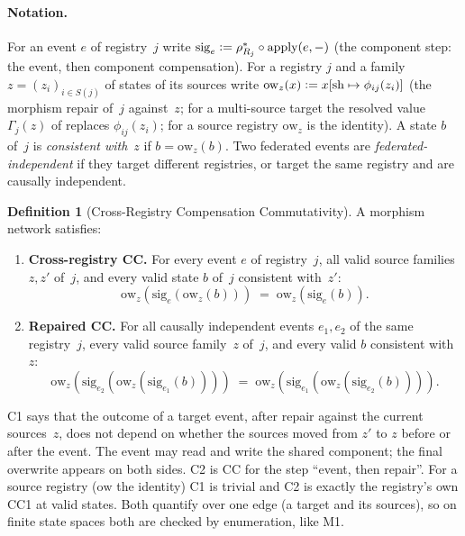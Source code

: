 \documentclass[11pt,a4paper]{article}
\theoremstyle{plain}
\theoremstyle{definition}
\newtheorem{definition}[theorem]{Definition}
\theoremstyle{remark}
\newcommand{\defeq}{\vcentcolon=}
\newcommand{\apply}{\mathrm{apply}}
\renewcommand{\_}{\textunderscore\allowbreak}
\begin{document}
\paragraph{Notation.}
For an event $e$ of registry~$j$ write
$\mathrm{sig}_e \defeq \rho_{R_j}^* \circ \apply(e, -)$ (the component step: the
event, then component compensation).  For a registry $j$ and a family
$z = (z_i)_{i \in S(j)}$ of states of its sources write
$\mathrm{ow}_z(x) \defeq x[\mathrm{sh} \mapsto \phi_{ij}(z_i)]$ (the morphism
repair of~$j$ against~$z$; for a multi-source target the resolved value
$\Gamma_j(z)$ of  replaces $\phi_{ij}(z_i)$; for a source
registry $\mathrm{ow}_z$ is the identity).  A state $b$ of~$j$ is
\emph{consistent with}~$z$ if $b = \mathrm{ow}_z(b)$.  Two federated events are
\emph{federated-independent} if they target different registries, or target the
same registry and are causally independent.

\begin{definition}[Cross-Registry Compensation Commutativity]
\label{def:c1c2}
A morphism network satisfies:
\begin{enumerate}[leftmargin=*,nosep]
\item[\textbf{(C1)}] \textbf{Cross-registry CC.}\; For every event $e$ of
  registry~$j$, all valid source families $z, z'$ of~$j$, and every valid
  state $b$ of~$j$ consistent with~$z'$:
  \[
  \mathrm{ow}_z(\mathrm{sig}_e(\mathrm{ow}_z(b))) \;=\; \mathrm{ow}_z(\mathrm{sig}_e(b)).
  \]
\item[\textbf{(C2)}] \textbf{Repaired CC.}\; For all causally independent events
  $e_1, e_2$ of the same registry~$j$, every valid source family~$z$ of~$j$, and
  every valid $b$ consistent with~$z$:
  \[
  \mathrm{ow}_z(\mathrm{sig}_{e_2}(\mathrm{ow}_z(\mathrm{sig}_{e_1}(b))))
  \;=\;
  \mathrm{ow}_z(\mathrm{sig}_{e_1}(\mathrm{ow}_z(\mathrm{sig}_{e_2}(b)))).
  \]
\end{enumerate}
\end{definition}

C1 says that the outcome of a target event, after repair against the current
sources~$z$, does not depend on whether the sources moved from $z'$ to $z$
before or after the event.  The event may read and write the shared component;
the final overwrite appears on both sides.  C2 is CC for the step ``event, then
repair''.  For a source registry ($\mathrm{ow}$ the identity) C1 is trivial and
C2 is exactly the registry's own CC1 at valid states.  Both quantify over one
edge (a target and its sources), so on finite state spaces both are checked by
enumeration, like M1.
\end{document}
